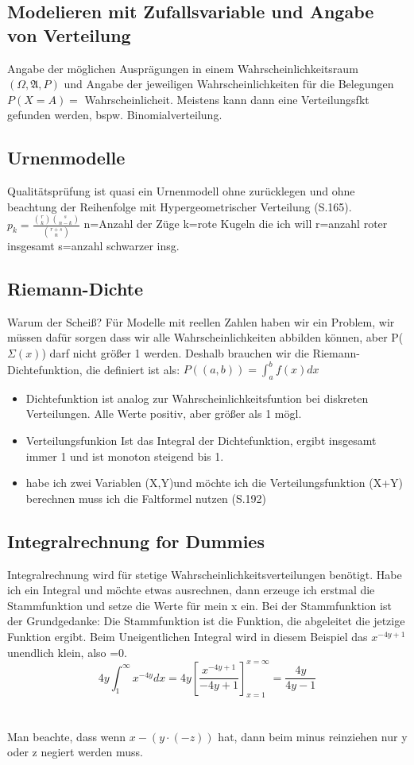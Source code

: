 \documentclass[10pt,a4paper]{article}
\begin{document}
	\subsection{Modelieren mit Zufallsvariable und Angabe von Verteilung}
	Angabe der möglichen Ausprägungen in einem Wahrscheinlichkeitsraum $(\Omega,\mathfrak{A},P)$ und Angabe der jeweiligen Wahrscheinlichkeiten für die Belegungen $P(X=A)=$ Wahrscheinlicheit. Meistens kann dann eine Verteilungsfkt gefunden werden, bspw. Binomialverteilung.
	\subsection{Urnenmodelle}
		Qualitätsprüfung ist quasi ein Urnenmodell ohne zurücklegen und ohne beachtung der Reihenfolge mit Hypergeometrischer Verteilung (S.165). $p_k=\frac{\binom{r}{k}\binom{s}{n-k}}{\binom{r+s}{n}}$ n=Anzahl der Züge k=rote Kugeln die ich will r=anzahl roter insgesamt s=anzahl schwarzer insg.
	\subsection{Riemann-Dichte}
	Warum der Scheiß? Für Modelle mit reellen Zahlen haben wir ein Problem, wir müssen dafür sorgen dass wir alle Wahrscheinlichkeiten abbilden können, aber P($\Sigma(x)$) darf nicht größer 1 werden. Deshalb brauchen wir die Riemann-Dichtefunktion, die definiert ist als:  $P((a,b))=\int_{a}^{b} f(x) dx$ 
	\begin{itemize}
		\item Dichtefunktion ist analog zur Wahrscheinlichkeitsfuntion bei diskreten Verteilungen. Alle Werte positiv, aber größer als 1 mögl.
		\item Verteilungsfunkion Ist das Integral der Dichtefunktion, ergibt insgesamt immer 1 und ist monoton steigend bis 1.
		\item habe ich zwei Variablen (X,Y)und möchte ich die Verteilungsfunktion (X+Y) berechnen muss ich die Faltformel nutzen (S.192)
	\end{itemize}
	\subsection{Integralrechnung for Dummies}
	Integralrechnung wird für stetige Wahrscheinlichkeitsverteilungen benötigt. Habe ich ein Integral und möchte etwas ausrechnen, dann erzeuge ich erstmal die Stammfunktion und setze die Werte für mein x ein. Bei der Stammfunktion ist der Grundgedanke: Die Stammfunktion ist die Funktion, die abgeleitet die jetzige Funktion ergibt. Beim Uneigentlichen Integral wird in diesem Beispiel das $x^{-4y+1}$ unendlich klein, also =0. $$4y \int_{1}^{\infty}x^{-4y}dx = 4y \left[ \frac{x^{-4y+1}}{-4y+1}\right]_{x=1}^{x=\infty} = \frac{4y}{4y-1}$$ \\~\\Man beachte, dass wenn $x-(y\cdot(-z))$ hat, dann beim minus reinziehen nur y oder z negiert werden muss.
 
\end{document}
